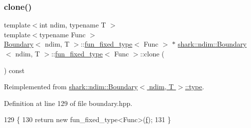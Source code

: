\subsubsection{\texorpdfstring{clone()}{clone()}}
{\footnotesize\ttfamily template$<$int ndim, typename T $>$ \\
template$<$typename Func $>$ \\
\hyperlink{classshark_1_1ndim_1_1_boundary}{Boundary}$<$ ndim, T $>$\+::\hyperlink{classshark_1_1ndim_1_1_boundary_1_1fun__fixed__type}{fun\+\_\+fixed\+\_\+type}$<$ Func $>$ $\ast$ \hyperlink{classshark_1_1ndim_1_1_boundary}{shark\+::ndim\+::\+Boundary}$<$ ndim, T $>$\+::\hyperlink{classshark_1_1ndim_1_1_boundary_1_1fun__fixed__type}{fun\+\_\+fixed\+\_\+type}$<$ Func $>$\+::clone (\begin{DoxyParamCaption}{ }\end{DoxyParamCaption}) const\hspace{0.3cm}{\ttfamily [virtual]}}



Reimplemented from \hyperlink{classshark_1_1ndim_1_1_boundary_1_1type_a5651988ce3a6c229009d3fa849e820dc}{shark\+::ndim\+::\+Boundary$<$ ndim, T $>$\+::type}.



Definition at line 129 of file boundary.\+hpp.


\begin{DoxyCode}
129                                                                                                 \{
130             \textcolor{keywordflow}{return} \textcolor{keyword}{new} fun\_fixed\_type<Func>(\hyperlink{classshark_1_1ndim_1_1_boundary_1_1fun__fixed__type_a968985106f368116b458500c16c4476f}{f});
131         \}
\end{DoxyCode}
\hypertarget{classshark_1_1ndim_1_1_boundary_1_1fun__fixed__type_adc9d38ff40b75decf5790ad6f701f3ad}{}\label{classshark_1_1ndim_1_1_boundary_1_1fun__fixed__type_adc9d38ff40b75decf5790ad6f701f3ad} 
